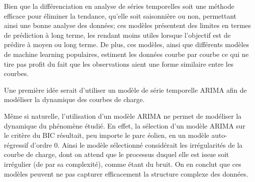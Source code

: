 Bien que la différenciation en analyse de séries temporelles soit une méthode efficace pour éliminer la tendance, qu'elle soit saisonnière ou non, permettant ainsi une bonne analyse des données; ces modèles présentent des limites en termes de prédiction à long terme, les rendant moins utiles lorsque l'objectif est de prédire à moyen ou long terme. De plus, ces modèles, ainsi que différents modèles de machine learning populaires, estiment les données courbe par courbe ce qui ne tire pas profit du fait que les observations aient une forme similaire entre les courbes.

\smallskip

Une première idée serait d'utiliser un modèle de série temporelle ARIMA afin de modéliser la dynamique des courbes de charge.


% 


Même si naturelle, l'utilisation d'un modèle ARIMA ne permet de modéliser la dynamique du phénomène étudié. En effet, la sélection d'un modèle ARIMA sur le critère du BIC résultait, peu importe le parc éolien, en un modèle auto-régressif d'ordre 0. Ainsi le modèle sélectionné considérait les irrégularités de la courbe de charge, dont on attend que le processus duquel elle est issue soit irrégulier (de par sa complexité), comme étant du bruit. On en conclut que ces modèles peuvent ne pas capturer efficacement la structure complexe des données.

\bigskip

\noindent
{}